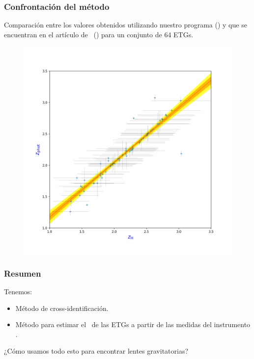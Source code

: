 \documentclass[8pt]{beamer}
\begin{document}
\begin{frame}

\frametitle{Confrontación del método}

Comparación entre los valores obtenidos utilizando nuestro programa () y que se encuentran en el artículo de \gonzalez\ () para un conjunto de 64 ETGs.

\vspace{-3mm}

\begin{figure}[htb]
\centering
\includegraphics[scale=0.3]{comparacion_Z.png}\par
\label{anarmonica}
\end{figure} 

\vspace{-3mm}

\hspace{2.9cm}

\end{frame}

\begin{frame}

\frametitle{Resumen}

Tenemos:

\begin{itemize}
    
    \item Método de cross-identificación.
    
    \item Método para estimar el \rt\ de las ETGs a partir de las medidas del instrumento \spire.
    
\end{itemize}

¿Cómo usamos todo esto para encontrar lentes gravitatorias?


\end{frame}
\end{document}
